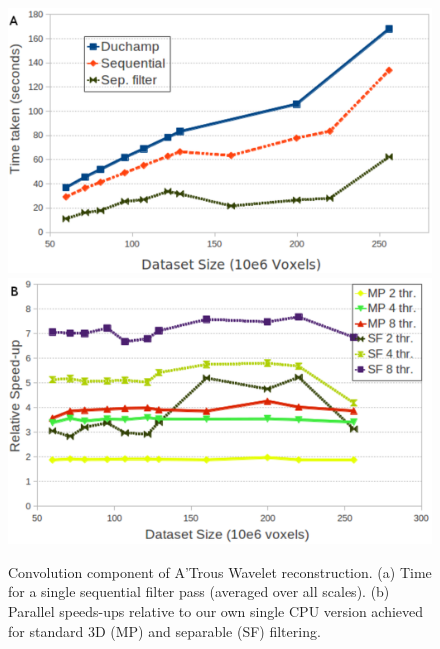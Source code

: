 \documentclass[11pt, twoside]{article}
\begin{document}
\begin{figure}[ht]
  \centering
  \includegraphics[scale=0.385]{O01_f1}
  \includegraphics[scale=0.385]{O01_f2}
  \caption{Convolution component of A'Trous Wavelet reconstruction.  (a) Time for a single sequential filter pass (averaged over all scales).  (b) Parallel speeds-ups relative to our own single CPU version achieved for standard 3D (MP) and separable (SF) filtering.} %
  \label{fig:H2}
\end{figure}
\end{document}
